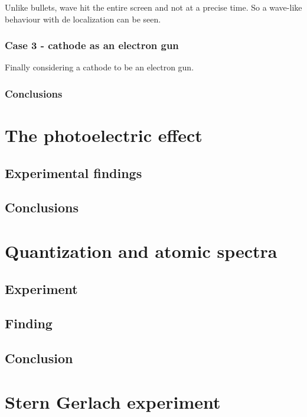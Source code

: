     Unlike bullets, wave hit the entire screen and not at a precise time.
    So a wave-like behaviour with de localization can be seen.

    \subsubsection{Case 3 - cathode as an electron gun}
    Finally considering a cathode to be an electron gun.

    \subsubsection{Conclusions}

\section{The photoelectric effect}

  \subsection{Experimental findings}

  \subsection{Conclusions}

\section{Quantization and atomic spectra}

  \subsection{Experiment}

  \subsection{Finding}

  \subsection{Conclusion}

\section{Stern Gerlach experiment}

